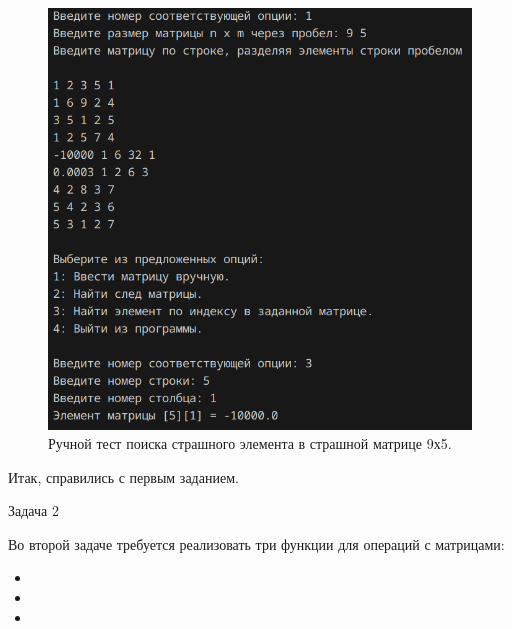\begin{figure}[H]
	\centering
	\includegraphics[width=0.5\linewidth]{tests-task3}
	\caption*{Ручной тест поиска страшного элемента в страшной матрице 9х5.}
	\label{fig:tests-task3}
\end{figure}
Итак, справились с первым заданием.\\

\begin{large}
	Задача 2\\
\end{large}
Во второй задаче требуется реализовать три функции для операций с матрицами:\\
\begin{itemize}
	\item 
	\item 
	\item
\end{itemize}






